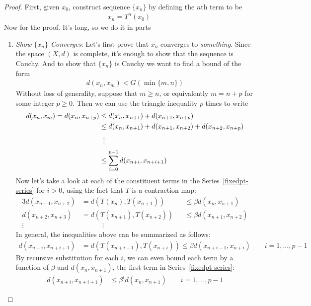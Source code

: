 \documentclass[12pt]{article}
\theoremstyle{plain}
\theoremstyle{definition}
\theoremstyle{remark}
\begin{document}
\begin{proof}
First, given $x_0$, construct sequence $\{x_n\}$ by defining the $n$th
term to be
\begin{align}
  \label{contraction-map-seq}
  x_n = T^n(x_0)
\end{align}
Now for the proof. It's long, so we do it in parts
\begin{enumerate}
\item
\emph{Show $\{x_n\}$ Converges}:
Let's first prove that $x_n$ converges to \emph{something}. Since the
space $(X,d)$ is complete, it's enough to show that the sequence is
Cauchy.  And to show that $\{x_n\}$ is Cauchy we want to find a bound of
the form
\begin{align*}
  d(x_n,x_m) < G(\min\{m,n\})
\end{align*}
Without loss of generality, suppose that $m\geq n$, or equivalently
$m=n+p$ for some integer $p\geq 0$. Then we can use the triangle
inequality $p$ times to write
\begin{align}
  d(x_n,x_m) = d(x_n,x_{n+p})
  &\leq d(x_n,x_{n+1}) + d(x_{n+1},x_{n+p}) \notag \\
  &\leq d(x_n,x_{n+1}) + d(x_{n+1},x_{n+2}) + d(x_{n+2},x_{n+p})\notag\\
  &\;\; \vdots\notag\\
  &\leq \sum^{p-1}_{i=0} d(x_{n+i},x_{n+i+1})
  \label{fixedpt-series}
\end{align}
Now let's take a look at each of the constituent terms in the
Series~\ref{fixedpt-series} for $i>0$, using the fact that $T$ is a
contraction map:
\begin{alignat*}{3}
  d(x_{n+1},x_{n+2}) &=
  d(T(x_{n}),T(x_{n+1}))
  &&\leq
  \beta d(x_{n},x_{n+1}) \\
  d(x_{n+2},x_{n+3}) &=
  d(T(x_{n+1}),T(x_{n+2}))
  &&\leq
  \beta d(x_{n+1},x_{n+2}) \\
  \vdots \quad & \quad\qquad \vdots
\end{alignat*}
In general, the inequalities above can be summarized as follows:
\begin{align*}
  d(x_{n+i},x_{n+i+1}) &=
  d(T(x_{n+i-1}),T(x_{n+i}))
  \leq
  \beta d(x_{n+i-1},x_{n+i})
  \qquad i = 1,\ldots,p-1
\end{align*}
By recursive substitution for each $i$, we can even bound each term by a
function of $\beta$ and $d(x_n,x_{n+1})$, the first term in
Series~\ref{fixedpt-series}:
\begin{align*}
  d(x_{n+i},x_{n+i+1})
  &\leq
  \beta^i d(x_{n},x_{n+1})
  \qquad i = 1,\ldots,p-1

\end{align*}
\end{enumerate}
\end{proof}
\end{document}
